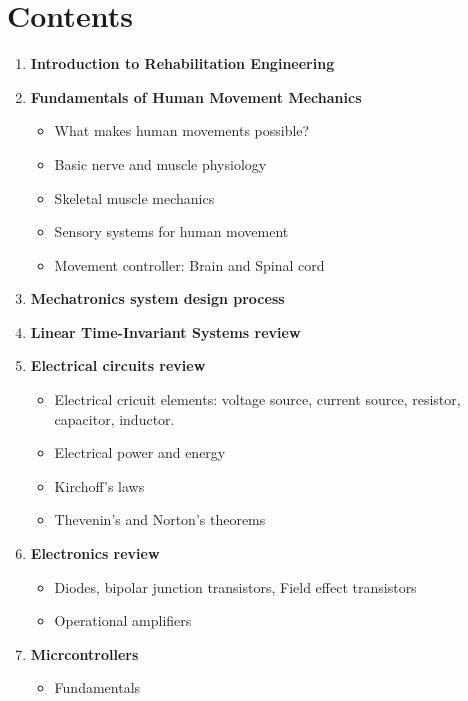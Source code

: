 \chapter{Contents}\label{chp:contents}





\begin{enumerate}
    \item \textbf{Introduction to Rehabilitation Engineering}
    \item \textbf{Fundamentals of Human Movement Mechanics}
    \begin{itemize}
        \item What makes human movements possible?
        \item Basic nerve and muscle physiology
        \item Skeletal muscle mechanics
        \item Sensory systems for human movement
        \item Movement controller: Brain and Spinal cord
    \end{itemize}
    \item \textbf{Mechatronics system design process}
    \item \textbf{Linear Time-Invariant Systems review}
    \item \textbf{Electrical circuits review}
    \begin{itemize}
        \item Electrical cricuit elements: voltage source, current source, resistor, capacitor, inductor.
        \item Electrical power and energy
        \item Kirchoff's laws
        \item Thevenin's and Norton's theorems 
    \end{itemize}
    \item \textbf{Electronics review}
    \begin{itemize}
        \item Diodes, bipolar junction transistors, Field effect transistors
        \item Operational amplifiers
    \end{itemize}
    \item \textbf{Micrcontrollers}
    \begin{itemize}
        \item Fundamentals

\end{itemize}
\end{enumerate}
